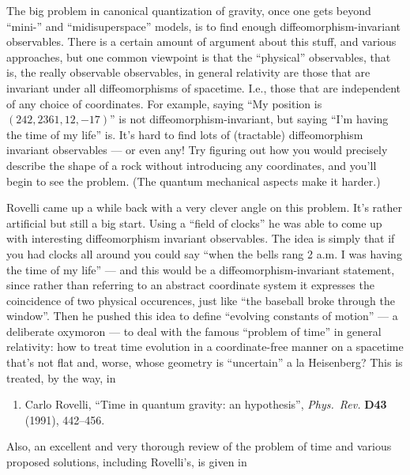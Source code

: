 \documentclass{article}
\def\tightlist{}
\begin{document}
The big problem in canonical quantization of gravity, once one gets
beyond ``mini-'' and ``midisuperspace'' models, is to find enough
diffeomorphism-invariant observables. There is a certain amount of
argument about this stuff, and various approaches, but one common
viewpoint is that the ``physical'' observables, that is, the really
observable observables, in general relativity are those that are
invariant under all diffeomorphisms of spacetime. I.e., those that are
independent of any choice of coordinates. For example, saying ``My
position is \((242,2361,12,-17)\)'' is not diffeomorphism-invariant, but
saying ``I'm having the time of my life'' is. It's hard to find lots of
(tractable) diffeomorphism invariant observables --- or even any! Try
figuring out how you would precisely describe the shape of a rock
without introducing any coordinates, and you'll begin to see the
problem. (The quantum mechanical aspects make it harder.)

Rovelli came up a while back with a very clever angle on this problem.
It's rather artificial but still a big start. Using a ``field of
clocks'' he was able to come up with interesting diffeomorphism
invariant observables. The idea is simply that if you had clocks all
around you could say ``when the bells rang 2 a.m. I was having the time
of my life'' --- and this would be a diffeomorphism-invariant statement,
since rather than referring to an abstract coordinate system it
expresses the coincidence of two physical occurences, just like ``the
baseball broke through the window''. Then he pushed this idea to define
``evolving constants of motion'' --- a deliberate oxymoron --- to deal
with the famous ``problem of time'' in general relativity: how to treat
time evolution in a coordinate-free manner on a spacetime that's not
flat and, worse, whose geometry is ``uncertain'' a la Heisenberg? This
is treated, by the way, in

\begin{enumerate}
\def\labelenumi{\arabic{enumi})}
\setcounter{enumi}{2}
\tightlist
\item
  Carlo Rovelli, ``Time in quantum gravity: an hypothesis'', \emph{Phys.\
  Rev.} \textbf{D43} (1991), 442--456.
\end{enumerate}

Also, an excellent and very thorough review of the problem of time and
various proposed solutions, including Rovelli's, is given in
\end{document}
